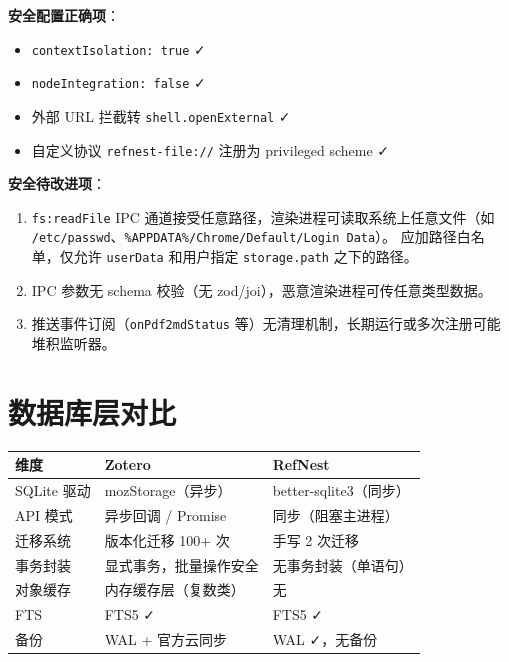 \documentclass[12pt, a4paper]{article}
\begin{document}
\textbf{安全配置正确项}：
\begin{itemize}[leftmargin=2em, itemsep=2pt]
  \item \texttt{contextIsolation: true} ✓
  \item \texttt{nodeIntegration: false} ✓
  \item 外部 URL 拦截转 \texttt{shell.openExternal} ✓
  \item 自定义协议 \texttt{refnest-file://} 注册为 privileged scheme ✓
\end{itemize}

\textbf{安全待改进项}：

\begin{tcolorbox}[badbox]
\begin{enumerate}[leftmargin=1em, itemsep=2pt]
  \item \texttt{fs:readFile} IPC 通道接受任意路径，渲染进程可读取系统上任意文件（如 \texttt{/etc/passwd}、\texttt{\%APPDATA\%/Chrome/Default/Login Data}）。
        应加路径白名单，仅允许 \texttt{userData} 和用户指定 \texttt{storage.path} 之下的路径。
  \item IPC 参数无 schema 校验（无 zod/joi），恶意渲染进程可传任意类型数据。
  \item 推送事件订阅（\texttt{onPdf2mdStatus} 等）无清理机制，长期运行或多次注册可能堆积监听器。
\end{enumerate}
\end{tcolorbox}

\section{数据库层对比}

\begin{center}
\begin{tabular}{p{3.5cm} p{5cm} p{5cm}}
  \toprule
  \textbf{维度} & \textbf{Zotero} & \textbf{RefNest} \\
  \midrule
  SQLite 驱动   & mozStorage（异步） & better-sqlite3（同步） \\
  API 模式      & 异步回调 / Promise & 同步（阻塞主进程） \\
  迁移系统      & 版本化迁移 100+ 次 & 手写 2 次迁移 \\
  事务封装      & 显式事务，批量操作安全 & 无事务封装（单语句） \\
  对象缓存      & 内存缓存层（复数类） & 无 \\
  FTS           & FTS5 ✓ & FTS5 ✓ \\
  备份          & WAL + 官方云同步 & WAL ✓，无备份 \\
  \bottomrule
\end{tabular}
\end{center}
\end{document}
